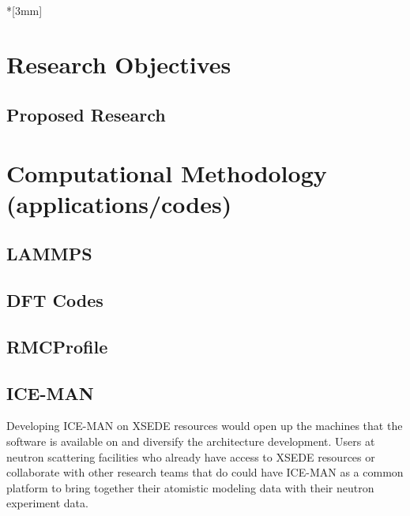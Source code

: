 \documentclass{proposalnsf}
\begin{document}
\\*[3mm]

\renewcommand{\thepage} {\arabic{page}}

\section*{Research Objectives}


\subsection*{Proposed Research}





\section*{Computational Methodology (applications/codes)}
\subsection*{LAMMPS}


\subsection*{DFT Codes}



\subsection*{RMCProfile}


\subsection*{ICE-MAN}

Developing ICE-MAN on XSEDE resources would open up the machines that the software is available on and diversify the architecture development. Users at neutron scattering facilities who already have access to XSEDE resources or collaborate with other research teams that do could have ICE-MAN as a common platform to bring together their atomistic modeling data with their neutron experiment data.
\end{document}
